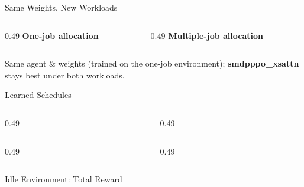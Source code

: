 \begin{frame}{Same Weights, New Workloads}
  \begin{columns}[T,onlytextwidth]
    \begin{column}{0.49\textwidth}
      \centering
      {\bfseries\color{DeepBlue} One-job allocation}\\[3pt]
    \end{column}
    \begin{column}{0.49\textwidth}
      \centering
      {\bfseries\color{DeepBlue} Multiple-job allocation}\\[3pt]
    \end{column}
  \end{columns}

  \vspace{0.3em}
  \centering
  {\small\textcolor{DeepBlue}{Same agent \& weights (trained on the one-job environment); \textbf{smdpppo\_xsattn} stays best under both workloads.}}
\end{frame}

\begin{frame}{Learned Schedules}
  \centering
  \begin{columns}[c,onlytextwidth]
    \begin{column}{0.49\textwidth}\centering
      \\[1pt]
    \end{column}
    \begin{column}{0.49\textwidth}\centering
      \\[1pt]
    \end{column}
  \end{columns}
  \vspace{3pt}
  \begin{columns}[c,onlytextwidth]
    \begin{column}{0.49\textwidth}\centering
      \\[1pt]
    \end{column}
    \begin{column}{0.49\textwidth}\centering
      \\[1pt]
    \end{column}
  \end{columns}
\end{frame}

\begin{frame}{Idle Environment: Total Reward}
  \centering
\end{frame}

